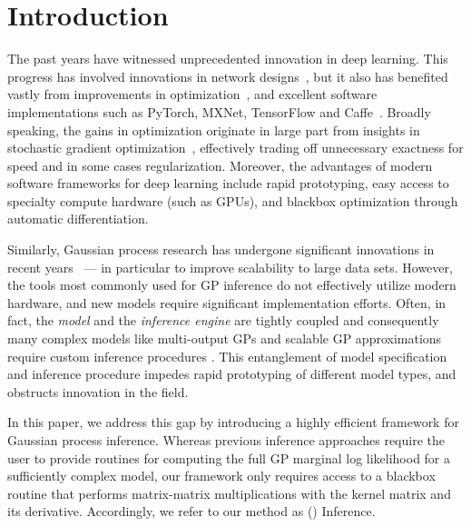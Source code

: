 \section{Introduction}
The past years have witnessed unprecedented innovation in deep learning. This progress has involved innovations in network designs~\cite{alexnet,hahnloser2000digital,he2016deep,huang2017densely,batchnorm}, but it also has benefited vastly from improvements in optimization~\cite{bottou2010large}, and excellent software implementations such as PyTorch, MXNet, TensorFlow and Caffe~\cite{paszke2017automatic,chen2015mxnet,abadi2016tensorflow,jia2014caffe}. Broadly speaking, the gains in optimization originate in large part from insights in stochastic gradient optimization~\citep{bottou2010large, krizhevsky2012imagenet, chaudhari2016entropy, hochreiter1997flat, keskar2016large, izmailov2018averaging}, effectively trading off unnecessary exactness for speed and in some cases regularization. Moreover, the advantages of modern software frameworks for deep learning include rapid prototyping, easy access to specialty compute hardware (such as GPUs), and blackbox optimization through automatic differentiation.

Similarly, Gaussian process research has undergone significant innovations in recent years~\cite{titsias2009variational,hensman2013gaussian,wilson2014thesis,wilson2015kernel,wilson2015thoughts,cunningham2008fast} --- in particular to improve scalability to large data sets. However,
the tools most commonly used for GP inference do not effectively utilize modern hardware, and new models require significant implementation efforts. Often, in fact, the \emph{model} and the \emph{inference engine} are tightly coupled and consequently many complex models like multi-output GPs and scalable GP approximations require custom inference procedures \cite{hensman2015scalable,bonilla2008multi}. This entanglement of model specification and inference procedure impedes rapid prototyping of different model types, and obstructs innovation in the field.

In this paper, we address this gap by introducing a highly efficient framework for Gaussian process inference.
Whereas previous inference approaches require the user to provide routines for computing the full GP marginal log likelihood for a sufficiently complex model,
our framework only requires access to a blackbox routine that performs matrix-matrix multiplications with the kernel matrix and its derivative.
Accordingly, we refer to our method as \mmfullname{} (\mmacro{}) Inference.

